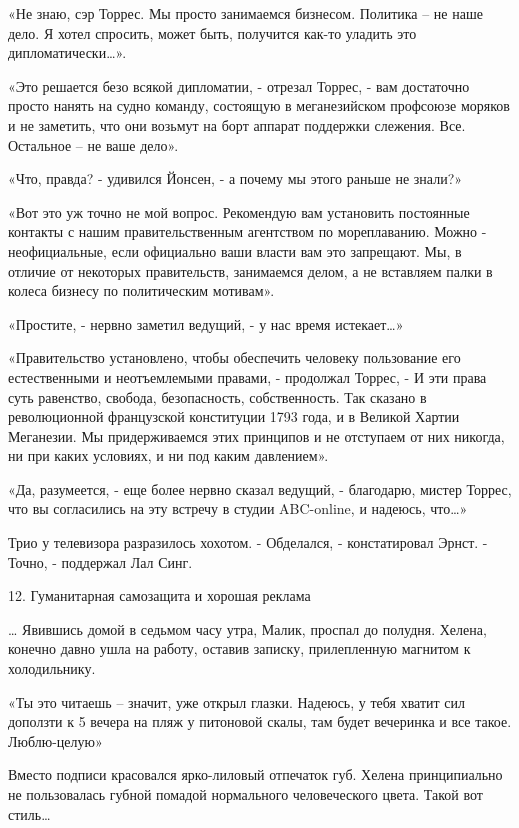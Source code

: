 \documentclass{book}
\begin{document}
«Не знаю, сэр Торрес. Мы просто занимаемся бизнесом. Политика -- не наше дело. Я хотел спросить, может быть, получится как-то уладить это дипломатически\ldots{}».

«Это решается безо всякой дипломатии, - отрезал Торрес, - вам достаточно просто нанять на судно команду, состоящую в меганезийском профсоюзе моряков и не заметить, что они возьмут на борт аппарат поддержки слежения. Все. Остальное -- не ваше дело».

«Что, правда? - удивился Йонсен, - а почему мы этого раньше не знали?»

«Вот это уж точно не мой вопрос. Рекомендую вам установить постоянные контакты с нашим правительственным агентством по мореплаванию. Можно - неофициальные, если официально ваши власти вам это запрещают. Мы, в отличие от некоторых правительств, занимаемся делом, а не вставляем палки в колеса бизнесу по политическим мотивам».

«Простите, - нервно заметил ведущий, - у нас время истекает\ldots{}»

«Правительство установлено, чтобы обеспечить человеку пользование его естественными и неотъемлемыми правами, - продолжал Торрес, - И эти права суть равенство, свобода, безопасность, собственность. Так сказано в революционной французской конституции 1793 года, и в Великой Хартии Меганезии. Мы придерживаемся этих принципов и не отступаем от них никогда, ни при каких условиях, и ни под каким давлением».

«Да, разумеется, - еще более нервно сказал ведущий, - благодарю, мистер Торрес, что вы согласились на эту встречу в студии ABC-online, и надеюсь, что\ldots{}»

Трио у телевизора разразилось хохотом.
- Обделался, - констатировал Эрнст.
- Точно, - поддержал Лал Синг.



12. Гуманитарная самозащита и хорошая реклама


\ldots{} Явившись домой в седьмом часу утра, Малик, проспал до полудня. Хелена, конечно давно ушла на работу, оставив записку, прилепленную магнитом к холодильнику.

«Ты это читаешь -- значит, уже открыл глазки. Надеюсь, у тебя хватит сил доползти к 5 вечера на пляж у питоновой скалы, там будет вечеринка и все такое. Люблю-целую»

Вместо подписи красовался ярко-лиловый отпечаток губ. Хелена принципиально не пользовалась губной помадой нормального человеческого цвета. Такой вот стиль\ldots{}
\end{document}
